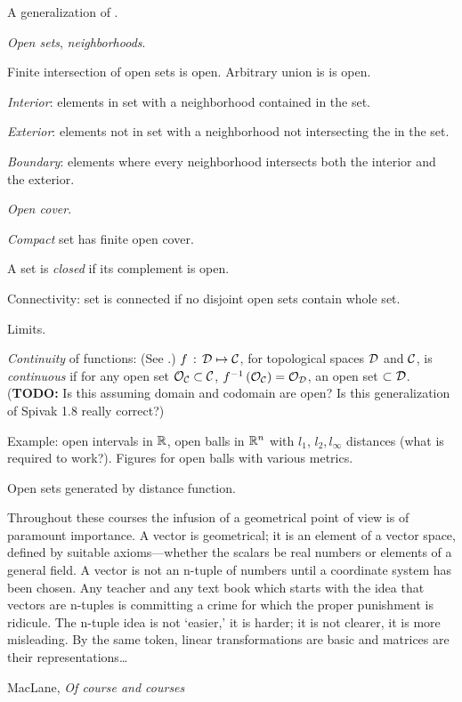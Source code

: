 \label{sec:Topological-spaces}

A generalization of
\cite[chapter~1]{spivak-1965}.

\textit{Open sets}, \textit{neighborhoods}.

Finite intersection of open sets is open.
Arbitrary union is is open. 

\textit{Interior}: elements in set 
with a neighborhood contained
in the set.

\textit{Exterior}: elements not in set
with a neighborhood not intersecting the
in the set.

\textit{Boundary}: elements where every neighborhood
intersects both the interior and the exterior.

\textit{Open cover}. 

\textit{Compact} set has finite open cover.

A set is \textit{closed} if its complement is open.

Connectivity: set is connected if no disjoint open sets contain
whole set.

Limits.

\textit{Continuity} of functions: 
(See \cite[Theorem~1-8]{spivak-1965}.)
$f \, : \, \mathcal{D} \mapsto \mathcal{C}$,
for topological spaces $\mathcal{D}$ and $\mathcal{C}$,
is \textit{continuous}
if for any open set $\mathcal{O}_{\mathcal{C}} \subset \mathcal{C}$,
$f^{-1}\left( \mathcal{O}_{\mathcal{C}} \right) = 
\mathcal{O}_{\mathcal{D}}$, an open set $\subset \mathcal{D}$.
(\textbf{TODO:} Is this assuming domain and codomain are open?
Is this generalization of Spivak 1.8 really correct?)

Example: open intervals in $\mathbb{R}$,
open balls in $\mathbb{R}^n$ with $l_1$, $l_2, l_{\infty}$ distances
(what is required to work?).
Figures for open balls with various metrics.

\label{sec:Metric-spaces}

Open sets generated by distance function.

\label{sec:Linear-spaces}

\epigraph{Throughout these courses the infusion of a geometrical
point of view is of paramount importance. A vector
is geometrical; it is an element of a vector space, defined
by suitable axioms—whether the scalars be real numbers or
elements of a general field. A vector is not an n-tuple of
numbers until a coordinate system has been chosen. Any
teacher and any text book which starts with the idea that vectors
are n-tuples is committing a crime for which the proper
punishment is ridicule. The n-tuple idea is not ‘easier,’ it is
harder; it is not clearer, it is more misleading. By the same
token, linear transformations are basic and matrices are their
representations\ldots}
{MacLane, \textit{Of course and courses}\cite{MacLane:1954}}

